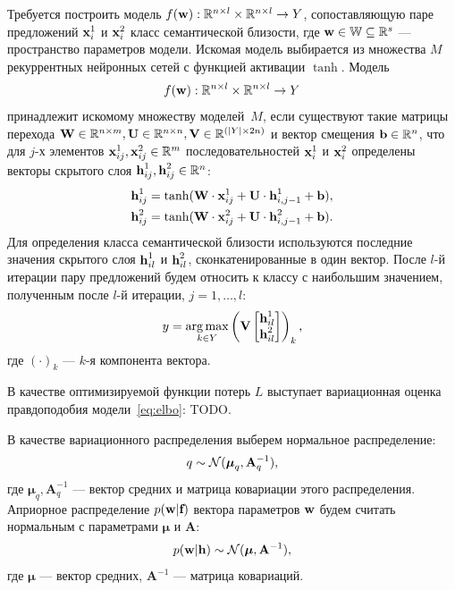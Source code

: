 Требуется построить модель $f({\textbf{w}}): \mathbb{R}^{n\times l} \times \mathbb{R}^{n\times l} \to Y$, сопоставляющую паре предложений ${\textbf{x}}_i^1$ и ${\textbf{x}}_i^2$ класс семантической близости, где ${\textbf{w}} \in {\mathbb{W}}\subseteq\mathbb{R}^s$ --- пространство параметров модели.
Искомая модель выбирается из множества $M$ рекуррентных нейронных сетей с функцией активации $\tanh$. Модель 
\[
f({\textbf{w}}): \mathbb{R}^{n\times l} \times \mathbb{R}^{n\times l} \to Y
\]
принадлежит искомому множеству моделей~$M$, если существуют такие матрицы перехода ${\textbf{W}}\in \mathbb{R}^{n\times m}, {\textbf{U}}\in \mathbb{R}^{n\times n}, {\textbf{V}}\in \mathbb{R}^{(|Y| \times 2n)}$ и вектор смещения ${\mathbf{b}} \in \mathbb{R}^{n}$, что для $j$-х элементов ${\textbf{x}}_{ij}^1, {\textbf{x}}_{ij}^2 \in \mathbb{R}^m$ последовательностей ${\textbf{x}}_i^1$ и ${\textbf{x}}_i^2$ определены векторы скрытого слоя ${\textbf{h}}_{ij}^1, {\textbf{h}}_{ij}^2 \in \mathbb{R}^{n}$:
\begin{gather}
{\textbf{h}}_{ij}^1 = \tanh({\textbf{W}}\cdot {\textbf{x}}_{ij}^1 + {\textbf{U}}\cdot {\textbf{h}}_{i,j-1}^1 + {\mathbf{b}}),\\
{\textbf{h}}_{ij}^2 = \tanh({\textbf{W}}\cdot {\textbf{x}}_{ij}^2 + {\textbf{U}}\cdot {\textbf{h}}_{i,j-1}^2 + {\mathbf{b}}).
\end{gather}
Для определения класса семантической близости используются последние значения скрытого слоя ${\textbf{h}}_{il}^1$ и ${\textbf{h}}_{il}^2$, сконкатенированные в один вектор. После $l$-й итерации 
пару предложений будем относить к классу с наибольшим значением, полученным после $l$-й итерации, $j=1,\dots,l$:
\begin{gather}
y = \argmax_{k\in Y}
\left(\bV%
\begin{bmatrix}
\bh_{il}^1\\
\bh_{il}^2
\end{bmatrix}\right)_k,
\label{eq:classify}
\end{gather}
где $(\cdot)_k$ --- $k$-я компонента вектора. 

В качестве оптимизируемой функции потерь $L$ выступает вариационная оценка правдоподобия модели~\eqref{eq:elbo}:
TODO. 

В качестве вариационного распределения выберем нормальное распределение:
$$q \sim {\mathcal{N}}(\boldsymbol{\mu}_q,\mathbf{A}_q^{-1}),$$
где $\boldsymbol{\mu}_q,\mathbf{A}_q^{-1}$ --- вектор средних и матрица ковариации этого распределения.
Априорное распределение $p({\textbf{w}}|{\textbf{f}})$ вектора параметров ${\textbf{w}}$ будем считать нормальным с параметрами $\boldsymbol{\mu}$ и $\mathbf{A}$:
$$p({\textbf{w}}|\mathbf{h}) \sim {\mathcal{N}}(\boldsymbol{\mu}, \mathbf{A}^{-1}),$$
где $\boldsymbol{\mu}$ --- вектор средних, $\mathbf{A}^{-1}$ --- матрица ковариаций.

